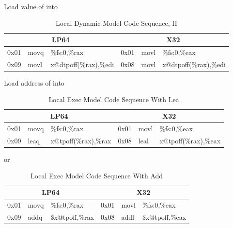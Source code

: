 \begin{description}
\item[]
  Load value of  into 

\begin{table}[H]
\Hrule
\caption{Local Dynamic Model Code Sequence, II}
\begin{center}
\code\small{
\begin{tabular}{lll|lll}
\multicolumn{3}{c}{LP64} & \multicolumn{3}{c}{X32} \\
\hline
0x01 & movq & \%fs:0,\%rax		& 0x01 & movl & \%fs:0,\%eax \\
0x09 & movl & x@dtpoff(\%rax),\%edi	& 0x08 & movl & x@dtpoff(\%rax),\%edi \\
\end{tabular}
}
\end{center}
\Hrule
\end{table}

\item[]
  Load address of  into 

\begin{table}[H]
\Hrule
\caption{Local Exec Model Code Sequence With Lea}
\begin{center}
\code\small{
\begin{tabular}{lll|lll}
\multicolumn{3}{c}{LP64} & \multicolumn{3}{c}{X32} \\
\hline
0x01 & movq & \%fs:0,\%rax		& 0x01 & movl & \%fs:0,\%eax \\
0x09 & leaq & x@tpoff(\%rax),\%rax	& 0x08 & leal & x@tpoff(\%rax),\%eax \\
\end{tabular}
}
\end{center}
\Hrule
\end{table}

or

\begin{table}[H]
\Hrule
\caption{Local Exec Model Code Sequence With Add}
\begin{center}
\code\small{
\begin{tabular}{lll|lll}
\multicolumn{3}{c}{LP64} & \multicolumn{3}{c}{X32} \\
\hline
0x01 & movq & \%fs:0,\%rax		& 0x01 & movl & \%fs:0,\%eax \\
0x09 & addq & \$x@tpoff,\%rax		& 0x08 & addl & \$x@tpoff,\%eax \\
\end{tabular}
}
\end{center}
\Hrule
\end{table}


\end{description}
